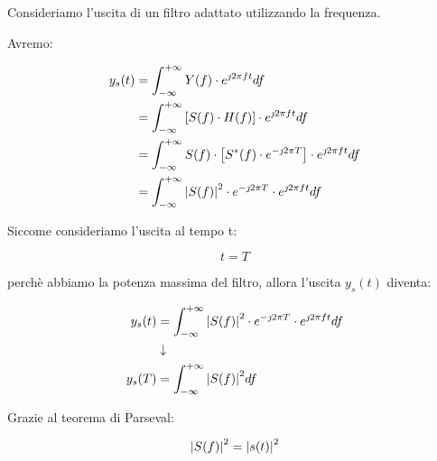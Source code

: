 Consideriamo l'uscita di un filtro adattato utilizzando la frequenza. \newline 

Avremo: 

{
    \Large 
    \begin{equation}
        \begin{split}
            y_s (t)
            &= 
            \int_{- \infty}^{+ \infty}
            Y(f) \cdot e^{\jmath 2 \pi f t} df 
            \\
            &=
            \int_{- \infty}^{+ \infty}
            \left[
                S(f) \cdot H(f)
            \right]
            \cdot e^{\jmath 2 \pi f t} df 
            \\
            &=
            \int_{- \infty}^{+ \infty}
                S(f) \cdot 
                \left[S^{*} (f) \cdot e^{- \jmath 2 \pi T} \right]
            \cdot e^{\jmath 2 \pi f t} df 
            \\
            &=
            \int_{- \infty}^{+ \infty}
                 \abs{S(f)}^{2} \cdot e^{- \jmath 2 \pi T} 
            \cdot e^{\jmath 2 \pi f t} df 
        \end{split}
    \end{equation}
}

Siccome consideriamo l'uscita al tempo t: 

{
    \Large
    \begin{equation}
        t = T
    \end{equation}
}

perchè abbiamo la potenza massima del filtro, allora l'uscita $y_s (t)$ diventa: 

{
    \Large 
    \begin{equation}
        \begin{split}
            y_s (t)
            &=
            \int_{- \infty}^{+ \infty}
                 \abs{S(f)}^{2} \cdot e^{- \jmath 2 \pi T} 
            \cdot e^{\jmath 2 \pi f t} df
            \\
            &\downarrow
            \\
            y_s (T)
            &=
            \int_{- \infty}^{+ \infty}
                 \abs{S(f)}^{2}  df
        \end{split}
    \end{equation}
} 

Grazie al teorema di Parseval: 

{
    \Large 
    \begin{equation}
        \abs{S(f)}^{2} = \abs{s(t)}^{2}
    \end{equation}
}

